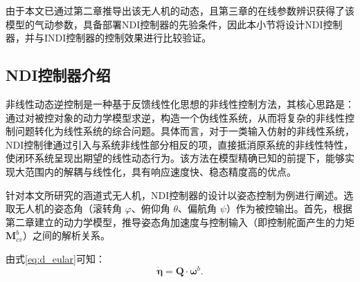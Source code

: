 由于本文已通过第二章推导出该无人机的动态，且第三章的在线参数辨识获得了该模型的气动参数，具备部署NDI控制器的先验条件，因此本小节将设计NDI控制器，并与INDI控制器的控制效果进行比较验证。

\subsection{NDI控制器介绍}
\label{sec:NDI_intro}

非线性动态逆控制是一种基于反馈线性化思想的非线性控制方法，其核心思路是：通过对被控对象的动力学模型求逆，构造一个伪线性系统，从而将复杂的非线性控制问题转化为线性系统的综合问题。具体而言，对于一类输入仿射的非线性系统，NDI控制律通过引入与系统非线性部分相反的项，直接抵消原系统的非线性特性，使闭环系统呈现出期望的线性动态行为。该方法在模型精确已知的前提下，能够实现大范围内的解耦与线性化，具有响应速度快、稳态精度高的优点。

针对本文所研究的涵道式无人机，NDI控制器的设计以姿态控制为例进行阐述。选取无人机的姿态角（滚转角 \(\varphi\)、俯仰角 \(\theta\)、偏航角 \(\psi\)）作为被控输出。首先，根据第二章建立的动力学模型，推导姿态角加速度与控制输入（即控制舵面产生的力矩 \(\boldsymbol{M}_{cv}^b\)）之间的解析关系。

由式\eqref{eq:d_eular}可知：
\begin{equation}
    \dot{\boldsymbol{\eta}} = \boldsymbol{Q} \cdot \boldsymbol{\omega}^b.
    \label{eq:Q_ref}
\end{equation}

